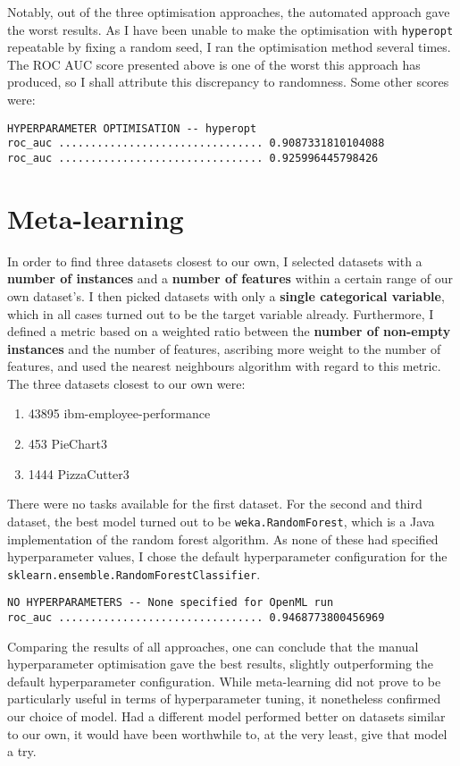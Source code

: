\documentclass[10pt, a4paper]{article}
\begin{document}
Notably, out of the three optimisation approaches, the automated approach gave the worst results. As I have been unable to make the
optimisation with \verb|hyperopt| repeatable by fixing a random seed, I ran the optimisation method several times. The ROC AUC
score presented above is one of the worst this approach has produced, so I shall attribute this discrepancy to randomness. Some other scores were:
\begin{verbatim}
HYPERPARAMETER OPTIMISATION -- hyperopt
roc_auc ................................ 0.9087331810104088
roc_auc ................................ 0.925996445798426
\end{verbatim}

\section{Meta-learning}

In order to find three datasets closest to our own, I selected datasets with a \textbf{number of instances} and a \textbf{number of features} 
within a certain range of our own dataset's. I then picked datasets with only a \textbf{single categorical variable}, which in all cases
turned out to be the target variable already. Furthermore, I defined a metric based on a weighted ratio between the
\textbf{number of non-empty instances} and the number of features, ascribing more weight to the number of features, and used the nearest
neighbours algorithm with regard to this metric. The three datasets closest to our own were:

\begin{enumerate}
\item 43895 ibm-employee-performance
\item 453 PieChart3
\item 1444 PizzaCutter3
\end{enumerate}

There were no tasks available for the first dataset. For the second and third dataset, the best model turned out to be
\verb|weka.RandomForest|, which is a Java implementation of the random forest algorithm. As none of these had specified
hyperparameter values, I chose the default \-hyperpara\-meter configuration for the \verb|sklearn.ensemble.RandomForestClassifier|.

\begin{verbatim}
NO HYPERPARAMETERS -- None specified for OpenML run
roc_auc ................................ 0.9468773800456969
\end{verbatim}

Comparing the results of all approaches, one can conclude that the \-manual hyperparameter optimisation gave the best results,
slightly outperforming the default hyperparameter configuration. While meta-learning did not prove to be particularly useful in
terms of hyperparameter tuning, it nonetheless confirmed our choice of model. Had a different model performed better on datasets
similar to our own, it would have been worthwhile to, at the very least, give that model a try.
\end{document}
